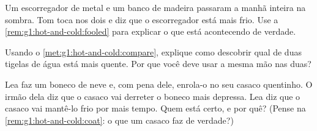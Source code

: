 \begin{exercise}[$\star$]\label{exo:g1:hot-and-cold:7}
Um escorregador de metal e um banco de madeira passaram a manhã
inteira na sombra. Tom toca nos dois e diz que o escorregador está
mais frio. Use a \cref{rem:g1:hot-and-cold:fooled} para explicar o
que está acontecendo de verdade.
\end{exercise}

\begin{exercise}[$\star$]\label{exo:g1:hot-and-cold:8}
Usando o \cref{met:g1:hot-and-cold:compare}, explique como descobrir
qual de duas tigelas de água está mais quente. Por que você deve usar
a mesma mão nas duas?
\end{exercise}

\begin{exercise}[$\star\star$]\label{exo:g1:hot-and-cold:9}
Lea faz um boneco de neve e, com pena dele, enrola-o no seu casaco
quentinho. O irmão dela diz que o casaco vai derreter o boneco mais
depressa. Lea diz que o casaco vai mantê-lo frio por mais tempo. Quem
está certo, e por quê? (Pense na \cref{rem:g1:hot-and-cold:coat}: o
que um casaco faz de verdade?)
\end{exercise}
